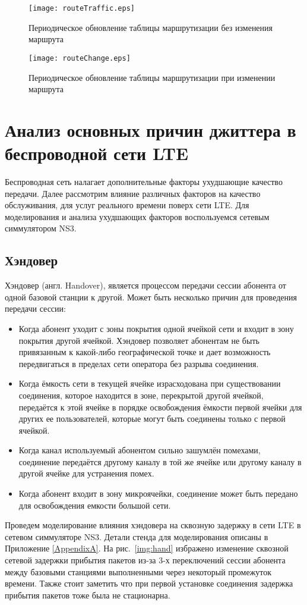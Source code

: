 \begin{figure} [h]
  \center
\texttt{[image: routeTraffic.eps]}
  \caption{Периодическое обновление таблицы маршрутизации без изменения маршрута \cite{clark}}
  \label{img:routeTraffic}
\end{figure}
\begin{figure} [h]
  \center
\texttt{[image: routeChange.eps]}
  \caption{Периодическое обновление таблицы маршрутизации при изменении маршрута \cite{clark}}
  \label{img:routeChange}
\end{figure}

\section{Анализ основных причин джиттера в беспроводной сети LTE} \label{sect2_2}
Беспроводная сеть налагает дополнительные факторы ухудшающие качество передачи. Далее рассмотрим влияние различных факторов на качество обслуживания, для услуг реального времени поверх сети LTE. Для моделирования и анализа ухудшающих факторов воспользуемся сетевым симмулятором NS3.

\subsection{Хэндовер}  \label{sect2_2_1}
Хэндовер (англ. Handover), является процессом передачи сессии абонента от одной базовой станции к другой. Может быть несколько причин для проведения передачи сессии:
\begin{itemize}
\item Когда абонент уходит с зоны покрытия одной ячейкой сети и входит в зону покрытия другой ячейкой. Хэндовер позволяет абонентам не быть привязанным к какой-либо географической точке и дает возможность передвигаться в пределах сети оператора без разрыва соединения.
\item Когда ёмкость сети в текущей ячейке израсходована при существовании соединения, которое находится в зоне, перекрытой другой ячейкой, передаётся к этой ячейке в порядке освобождения ёмкости первой ячейки для других ее пользователей, которые могут быть соединены только с первой ячейкой.
\item Когда канал используемый абонентом сильно зашумлён помехами, соединение передаётся другому каналу в той же ячейке или другому каналу в другой ячейке для устранения помех.
\item Когда абонент входит в зону микроячейки, соединение может быть передано для освобождения емкости большой сети.
\end{itemize}
Проведем моделирование влияния хэндовера на сквозную задержку в сети LTE в сетевом симмуляторе NS3. Детали стенда для моделирования описаны в Приложение \ref{AppendixA}. На рис. \ref{img:hand} избражено изменение сквозной сетевой задержки прибытия пакетов из-за 3-х переключений сессии абонента между базовыми станциями выполненными через некоторый промежуток времени. Также стоит заметить что при первой установке соединения задержка прибытия пакетов тоже была не стационарна.

